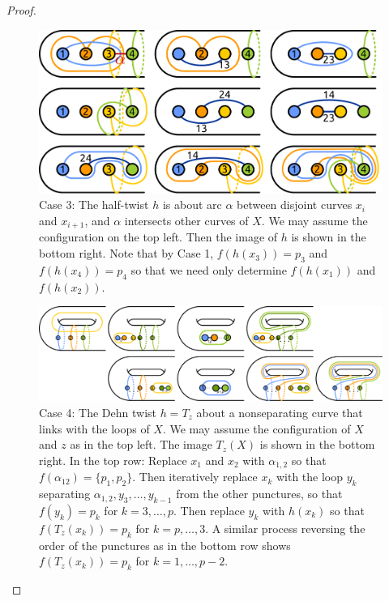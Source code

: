 \begin{proof}
    \begin{figure}[h!]
      \includegraphics[width=\textwidth]{figures/pcolorsequence3.pdf}
      \caption{Case 3: The half-twist $h$ is about arc $\alpha$
      between disjoint curves $x_i$ and $x_{i+1}$,
      and $\alpha$ intersects other curves of $X$.
      We may assume the configuration on the top left.
      Then the image of $h$ is shown in the bottom right.
      Note that by Case 1, $f(h(x_3))=p_3$ and $f(h(x_4))=p_4$
      so that we need only determine $f(h(x_1))$ and $f(h(x_2))$.
      }
      \label{fig:pcolor3}
    \end{figure}
    \begin{figure}[h!]
      \includegraphics[width=1\textwidth]{figures/pcolorsequence4.pdf}
      \caption{Case 4: The Dehn twist $h=T_z$ about a nonseparating curve
      that links with the loops of $X$.
      We may assume the configuration of $X$ and $z$ as in the top left.
      The image $T_z(X)$ is shown in the bottom right.
      In the top row: Replace $x_1$ and $x_2$ with $\alpha_{1,2}$
      so that $f(\alpha_{12})=\{p_1,p_2\}$.
      Then iteratively replace $x_k$ with the loop $y_k$ separating
      $\alpha_{1,2},y_3, \ldots, y_{k-1}$ from the other punctures,
      so that $f(y_k)=p_k$ for $k=3,\ldots,p$.
      Then replace $y_k$ with $h(x_k)$ so that $f(T_z(x_k))=p_k$
      for $k=p, \ldots, 3$.
      A similar process reversing the order of the punctures
      as in the bottom row shows $f(T_z(x_k))=p_k$ for $k=1,\ldots,p-2$.
      }
      \label{fig:pcolor4}
    \end{figure}


\end{proof}
